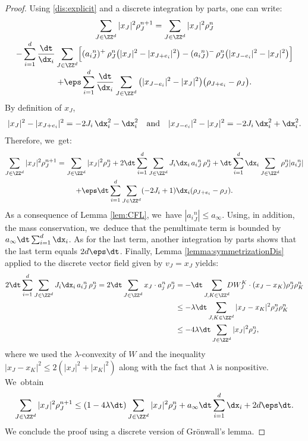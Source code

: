 \begin{proof}
Using \eqref{dis:explicit} and a discrete integration by parts,
one can write:\vspace*{-3pt}
\begin{multline*}
\sum_{J\in \ZZ^d} |x_J|^2 \rho_{J}^{n+1} =\sum_{J\in
\ZZ^d} |x_J|^2\rho_{J}^n\\[-3pt]
- \sum_{i=1}^d
\frac{\dt}{\dx_i} \sum_{J\in
\ZZ^d} \Bigl[ ({a_i}^n_{J})^+ \, \rho_{J}^n \big(|x_J|^2-|x_{J+e_i}|^2\big)
-({a_i}^n_{J})^- \, \rho_{J}^n \big(|x_{J-e_i}|^2-|x_{J}|^2\big)
\Bigr]
\\[-3pt]
+ \eps \sum_{i=1}^d
\frac{\dt}{\dx_i} \sum_{J\in
\ZZ^d}\big(|x_{J-e_i}|^2 - |x_J|^2\big)\big(\rho_{J+e_i} - \rho_J\big).
\end{multline*}
By definition of $x_J$,\vspace*{-3pt}
\[
|x_J|^2-|x_{J+e_i}|^2=-2J_i\, \dx_i^2 - \dx_i^2\quad\text{and}\quad
|x_{J-e_i}|^2-|x_J|^2=-2J_i\, \dx_i^2 + \dx_i^2.
\]
Therefore, we~get:\vspace*{-3pt}
\begin{multline*}
\sum_{J\in \ZZ^d} |x_J|^2 \rho_{J}^{n+1} = \sum_{J\in \ZZ^d}
|x_J|^2 \rho_{J}^{n} + 2\dt \sum_{i=1}^d\sum_{J\in \ZZ^d}
J_i \dx_i \, {a_i}^n_{J} \, \rho_{J}^n + \dt\sum_{i=1}^d \dx_i \sum_{J\in \ZZ^d} \rho_{J}^n |{a_i}^n_{J}| \\
+ \eps \dt\sum_{i=1}^d \sum_{J\in \ZZ^d} (-2J_i + 1) \dx_i(\rho_{J+e_i} - \rho_J).
\end{multline*}
As a consequence of Lemma \ref{lem:CFL}, we~have $|{a_i}^n_{J}|\leq a_\infty$.
Using, in addition, the mass conservation, we~deduce that the penultimate term is bounded by $a_\infty \dt \sum_{i=1}^d \dx_i$.
As for the last term, another integration by parts shows that the last term equals $2d\eps \dt$. Finally, Lemma \ref{lemma:symmetrizationDis} applied to the discrete vector field given by $v_J = x_J$ yields:\vspace*{-3pt}
\begin{align*}
2\dt \sum_{i=1}^d\sum_{J\in \ZZ^d}
J_i \dx_i \, {a_i}^n_{J} \, \rho_{J}^n = 2\dt \sum_{J\in \ZZ^d} x_J \cdot a_j^n \, \rho_{J}^n & = - \dt \sum_{J, K \in \ZZ^d}\hspace*{-2mm} DW_J^K \cdot (x_J - x_K) \rho_J^n \rho_K^n\\
& \leq - \lambda \dt \sum_{J, K \in \ZZ^d} |x_J - x_K|^2 \rho_J^n \rho_K^n \\
& \leq - 4\lambda \dt \sum_{J\in \ZZ^d} |x_J|^2 \rho_{J}^{n},
\end{align*}
where we used the $\lambda$-convexity of $W$ and the inequality $|x_J - x_K|^2 \leq 2(|x_J|^2 + |x_K|^2)$ along with the fact that $\lambda$ is nonpositive. We~obtain\vspace*{-3pt}
\[
\sum_{J\in \ZZ^d} |x_J|^2 \rho_{J}^{n+1} \leq
(1-4\lambda\dt)\sum_{J\in \ZZ^d} |x_J|^2 \rho_{J}^{n}
+ a_\infty\dt\sum_{i=1}^d\dx_i + 2d\eps \dt.
\]
We conclude the proof using a discrete version of Grönwall's lemma.
\end{proof}

